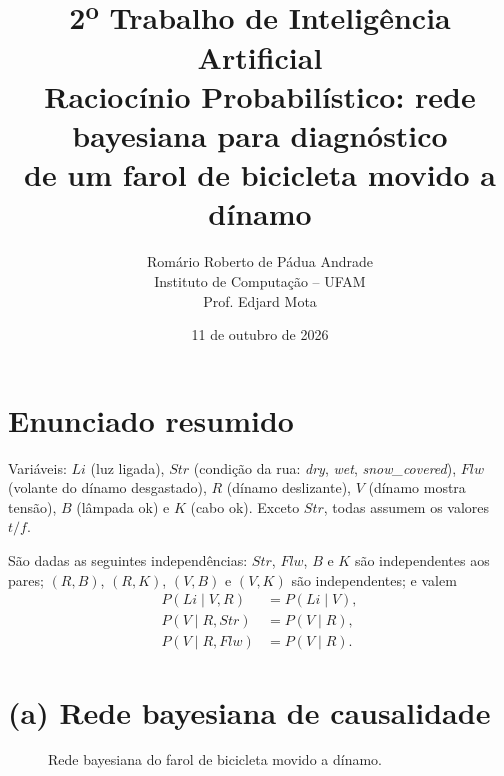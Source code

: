 \documentclass[12pt,a4paper]{article}
\title{2\textsuperscript{o} Trabalho de Inteligência Artificial\\[4pt]
\large Raciocínio Probabilístico: rede bayesiana para diagnóstico\\
de um farol de bicicleta movido a dínamo}
\author{Romário Roberto de Pádua Andrade\\
\small Instituto de Computação -- UFAM\\
\small Prof. Edjard Mota}
\date{11 de outubro de 2026}
\newcommand{\Str}{\mathit{Str}}
\newcommand{\Flw}{\mathit{Flw}}
\newcommand{\Li}{\mathit{Li}}
\begin{document}
\maketitle

\section*{Enunciado resumido}

Variáveis: $\Li$ (luz ligada), $\Str$ (condição da rua: \textit{dry}, \textit{wet},
\textit{snow\_covered}), $\Flw$ (volante do dínamo desgastado), $R$ (dínamo deslizante),
$V$ (dínamo mostra tensão), $B$ (lâmpada ok) e $K$ (cabo ok). Exceto $\Str$, todas
assumem os valores $t/f$.

São dadas as seguintes independências: $\Str$, $\Flw$, $B$ e $K$ são independentes aos
pares; $(R,B)$, $(R,K)$, $(V,B)$ e $(V,K)$ são independentes; e valem
\begin{align*}
P(\Li \mid V, R) &= P(\Li \mid V), \\
P(V \mid R, \Str) &= P(V \mid R), \\
P(V \mid R, \Flw) &= P(V \mid R).
\end{align*}

\section*{(a) Rede bayesiana de causalidade}


\begin{figure}[H]
\centering
{}
\caption{Rede bayesiana do farol de bicicleta movido a dínamo.}
\end{figure}
\end{document}
